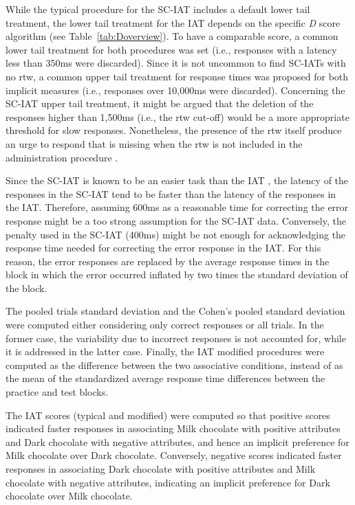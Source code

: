 \documentclass[12pt]{book}
\begin{document}
While the typical procedure for the SC-IAT includes a default lower tail treatment, the lower tail treatment for the IAT depends on the specific \emph{D} score algorithm (see Table~\ref{tab:Doverview}). To have a comparable score, a common lower tail treatment for both procedures was set (i.e., responses with a latency less than 350ms were discarded). 
Since it is not uncommon to find SC-IATs with no rtw, a common upper tail treatment for response times was proposed for both implicit measures (i.e., responses over 10,000ms were discarded). Concerning the SC-IAT upper tail treatment, it might be argued that the deletion of the responses higher than 1,500ms (i.e., the rtw cut-off) would be a more appropriate threshold for slow responses. Nonetheless, the presence of the rtw itself produce an urge to respond that is missing when the rtw is not included in the administration procedure \cite{karpinski2006}. 

Since the SC-IAT is known to be an easier task than the IAT \cite{karpinski2006}, the latency of the responses in the SC-IAT tend to be faster than the latency of the responses in the IAT. Therefore, assuming 600ms as a reasonable time for correcting the error response might be a too strong assumption for the SC-IAT data. Conversely, the penalty used in the SC-IAT (400ms) might be not enough for acknowledging the response time needed for correcting the error response in the IAT. For this reason, the error responses are replaced by the average response times in the block in which the error occurred inflated by two times the standard deviation of the block.  

The pooled trials standard deviation and the Cohen’s pooled standard deviation were computed either considering only correct responses or all trials. In the former case, the variability due to incorrect responses is not accounted for, while it is addressed in the latter case.
Finally, the IAT modified procedures were computed as the difference between the two associative conditions, instead of as the mean of the standardized average response time differences between the practice and test blocks.

The IAT scores (typical and modified) were computed so that positive scores indicated faster responses in associating Milk chocolate with positive attributes and Dark chocolate with negative attributes, and hence an implicit preference for Milk chocolate over Dark chocolate. Conversely, negative scores indicated faster responses in associating Dark chocolate with positive attributes and Milk chocolate with negative attributes, indicating an implicit preference for Dark chocolate over Milk chocolate. 
\end{document}
